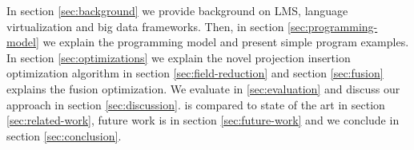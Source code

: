 In section \ref{sec:background} we provide background on LMS, language virtualization and big data frameworks. Then, in section \ref{sec:programming-model} we explain the programming model and present simple program examples. In section \ref{sec:optimizations} we explain the novel projection insertion optimization algorithm in section \ref{sec:field-reduction} and section \ref{sec:fusion} explains the fusion optimization. We evaluate \tool in \ref{sec:evaluation} and discuss our approach in section \ref{sec:discussion}. \tool is compared to state of the art in section \ref{sec:related-work}, future work is in section \ref{sec:future-work} and we conclude in section \ref{sec:conclusion}.
